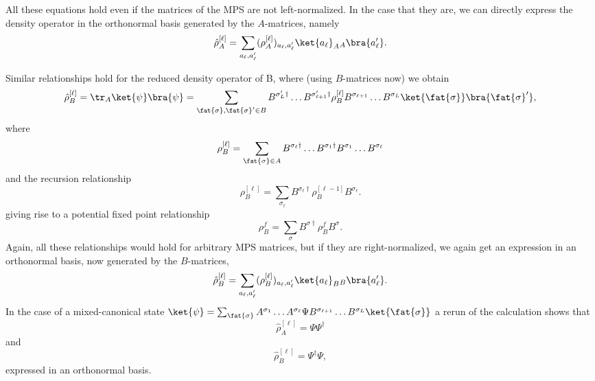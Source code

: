 All these equations hold even if the matrices of the MPS are not left-normalized. In the case that they are, we can directly express the density operator in the orthonormal basis generated by the $A$-matrices, namely
\begin{equation}
\hat{\rho}_A^{[\ell]} = \sum_{a_\ell, a'_\ell} (\rho_A^{[\ell]})_{a_\ell, a'_\ell} \ket{a_\ell}_A \phantom{{}}_A\bra{a'_\ell} .
\end{equation}

Similar relationships hold for the reduced density operator of B, where (using $B$-matrices now) we obtain
\begin{equation}
\hat{\rho}_B^{[\ell]} = \tr_A \ket{\psi}\bra{\psi} = \sum_{\fat{\sigma},\fat{\sigma}'\in B} 
B^{\sigma'_L\dagger} \ldots B^{\sigma'_{\ell+1}\dagger} \rho_B^{[\ell]} B^{\sigma_{\ell+1}} \ldots B^{\sigma_L} \ket{\fat{\sigma}} \bra{\fat{\sigma}'} ,
\end{equation}
where
\begin{equation}
\rho_B^{[\ell]} =  \sum_{\fat{\sigma}\in A} B^{\sigma_{\ell}\dagger} \ldots B^{\sigma_1\dagger} B^{\sigma_1} \ldots B^{\sigma_{\ell} }
\end{equation}
and the recursion relationship
\begin{equation}
\rho_B^{[\ell]} = \sum_{\sigma_\ell} B^{\sigma_\ell\dagger} \rho_B^{[\ell-1]} B^{\sigma_\ell} .
\label{eq:rhobrecursion}
\end{equation}
giving rise to a potential fixed point relationship
\begin{equation}
\rho_B^f = \sum_{\sigma} B^{\sigma\dagger} \rho_B^{f} B^{\sigma} .
\end{equation}
Again, all these relationships would hold for arbitrary MPS matrices, but if they are right-normalized, we again get an expression in an orthonormal basis, now generated by the $B$-matrices,
\begin{equation}
\hat{\rho}_B^{[\ell]} = \sum_{a_\ell, a'_\ell} (\rho_B^{[\ell]})_{a_\ell, a'_\ell} \ket{a_\ell}_B \phantom{{}}_B\bra{a'_\ell} .
\end{equation}
In the case of a mixed-canonical state $\ket{\psi}=\sum_{\fat{\sigma}} A^{\sigma_1}\ldots A^{\sigma_\ell}\Psi B^{\sigma_{\ell+1}} \ldots B^{\sigma_L} \ket{\fat{\sigma}}$ a rerun of the calculation shows that 
\begin{equation}
\hat{\rho}^{[\ell]}_A = \Psi \Psi^\dagger
\end{equation}
and
\begin{equation}
\hat{\rho}^{[\ell]}_B = \Psi^\dagger\Psi ,
\end{equation}
expressed in an orthonormal basis.

